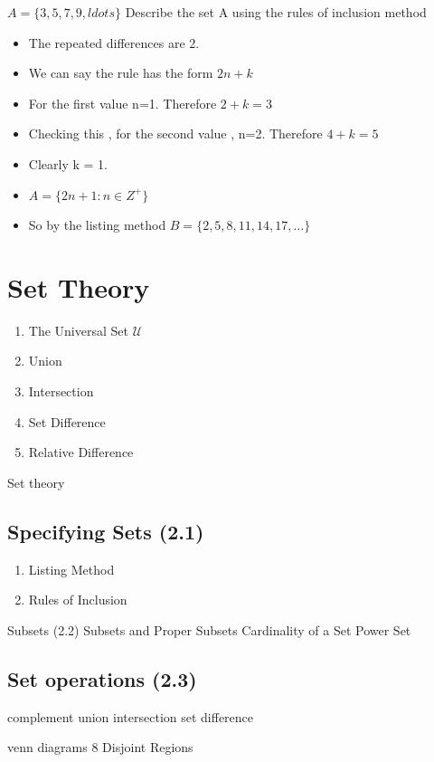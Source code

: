 \documentclass[]{report}
\begin{document}
$A = \{3,5,7,9,ldots \}$
Describe the set A using the rules of inclusion method

\begin{itemize}
	\item The repeated differences are 2.
	\item We can say the rule has the form $2n+k$
	\item For the first value n=1. Therefore $2+k=3$
	\item Checking this , for the second value , n=2. Therefore $4+k=5$
	\item Clearly k = 1.
	\item $A = \{2n+1 :n \in Z^{+} \}$
	\item So by the listing method $B= \{2,5,8,11,14,17,\ldots\}$
\end{itemize}

\section{Set Theory}
\begin{enumerate}
	\item The Universal Set $\mathcal{U}$
	\item Union
	\item Intersection
	\item Set Difference
	\item Relative Difference
\end{enumerate}


Set theory

\subsection{Specifying Sets (2.1)}

\begin{enumerate}
\item Listing Method
\item Rules of Inclusion
\end{enumerate}

Subsets (2.2)
Subsets and Proper Subsets
Cardinality of a Set
Power Set


\subsection{Set operations (2.3)}

complement
union 
intersection
set difference


venn diagrams
8 Disjoint Regions
\end{document}
